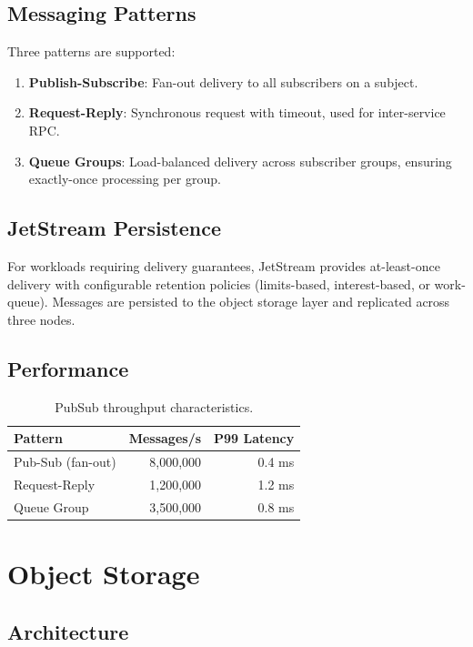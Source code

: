 \documentclass[11pt,a4paper]{article}
\begin{document}
\subsection{Messaging Patterns}

Three patterns are supported:
\begin{enumerate}
    \item \textbf{Publish-Subscribe}: Fan-out delivery to all subscribers on a subject.
    \item \textbf{Request-Reply}: Synchronous request with timeout, used for inter-service RPC.
    \item \textbf{Queue Groups}: Load-balanced delivery across subscriber groups, ensuring exactly-once processing per group.
\end{enumerate}

\subsection{JetStream Persistence}

For workloads requiring delivery guarantees, JetStream provides at-least-once delivery with configurable retention policies (limits-based, interest-based, or work-queue). Messages are persisted to the object storage layer and replicated across three nodes.

\subsection{Performance}

\begin{table}[h]
\centering
\caption{PubSub throughput characteristics.}
\begin{tabular}{lrr}
\toprule
\textbf{Pattern} & \textbf{Messages/s} & \textbf{P99 Latency} \\
\midrule
Pub-Sub (fan-out) & 8{,}000{,}000 & 0.4 ms \\
Request-Reply     & 1{,}200{,}000 & 1.2 ms \\
Queue Group       & 3{,}500{,}000 & 0.8 ms \\
\bottomrule
\end{tabular}
\end{table}

\section{Object Storage}

\subsection{Architecture}
\end{document}
